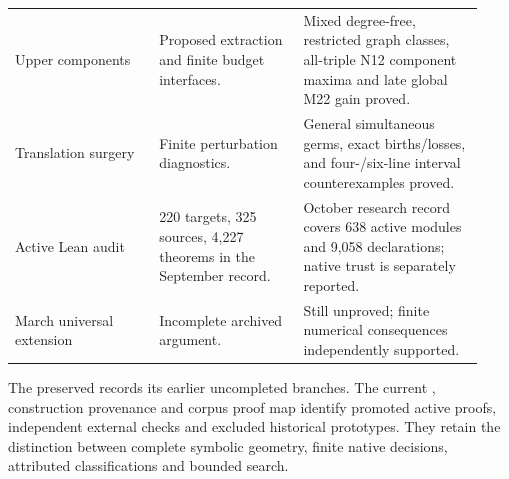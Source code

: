 \begin{longtable}{@{}P{0.29\linewidth}P{0.29\linewidth}P{0.35\linewidth}@{}}
Upper components & Proposed extraction and finite budget interfaces. &
Mixed degree-free, restricted graph classes, all-triple N12 component
maxima and late global M22 gain proved.\\
Translation surgery & Finite perturbation diagnostics. & General
simultaneous germs, exact births/losses, and four-/six-line interval
counterexamples proved.\\
Active Lean audit & 220 targets, 325 sources, 4,227 theorems in the
September record. & October research record covers 638 active modules
and 9,058 declarations; native trust is separately reported.\\
March universal extension & Incomplete archived argument. & Still
unproved; finite numerical consequences independently supported.\\
\end{longtable}

The preserved 
records its earlier uncompleted branches. The current
,
construction provenance and corpus proof map identify promoted active
proofs, independent external checks and excluded historical prototypes.
They retain the distinction between complete symbolic geometry,
finite native decisions, attributed classifications and bounded search.
